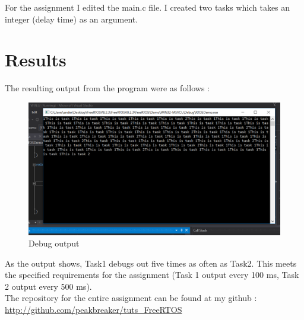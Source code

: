 \documentclass[12pt,fleqn,leqno,letterpaper]{article}
\begin{document}
        For the assignment I edited the main.c file.  I created two tasks which takes an integer (delay time) as an argument.
    \newpage
    \section*{Results}

        The resulting output from the program were as follows : \\

        \begin{figure}[h]
            \centering
            \includegraphics[width=\textwidth]{Debug.png}
            \caption{Debug output}
            \label{figure:debug}
        \end{figure}

        As the output shows, Task1 debugs out five times as often as Task2.  This meets the specified requirements for the assignment (Task 1 output every 100 ms, Task 2 output every 500 ms).\\
        
        The repository for the entire assignment can be found at my github : \\
        
        \url{http://github.com/peakbreaker/tuts\_FreeRTOS}

    
\end{document}
